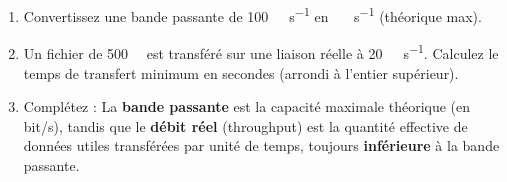 \documentclass[11pt]{article}
\begin{document}
\begin{exercice}
\begin{enumerate}
    \item Convertissez une bande passante de \SI{100}{\mega\bit\per\second} en \SI{}{\mega\byte\per\second} (théorique max).
    \item Un fichier de \SI{500}{\mega\byte} est transféré sur une liaison réelle à \SI{20}{\mega\bit\per\second}. Calculez le temps de transfert minimum en secondes (arrondi à l'entier supérieur).
    \item Complétez : La \textbf{bande passante} est la capacité maximale théorique (en bit/s), tandis que le \textbf{débit réel} (throughput) est la quantité effective de données utiles transférées par unité de temps, toujours \textbf{inférieure} à la bande passante.
\end{enumerate}
\end{exercice}
\end{document}
